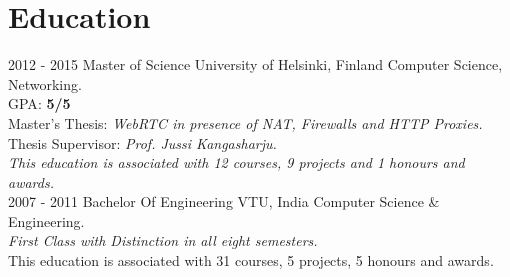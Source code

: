 \documentclass[]{friggeri-cv}
\begin{document}
\section{Education}
\begin{entrylist}
  \entry
    {2012 - 2015}
    {Master of Science}
    {\Large{University of Helsinki, Finland}}
    {Computer Science, Networking.\\
     {GPA}: \textbf{5/5} \\
     {Master's Thesis}: \emph{WebRTC in presence of NAT, Firewalls and HTTP Proxies.}\\
     {Thesis Supervisor}: \emph{Prof. Jussi Kangasharju.}\\
     \emph{This education is associated with 12 courses, 9 projects and 1 honours and awards.}\\}
  \entry
    {2007 - 2011}
    {Bachelor Of Engineering}
    {\Large{VTU, India}}
    {Computer Science \& Engineering.\\
    \emph{First Class with Distinction in all eight semesters.}\\
    This education is associated with 31 courses, 5 projects, 5 honours and awards.\\}
\end{entrylist}
\end{document}
